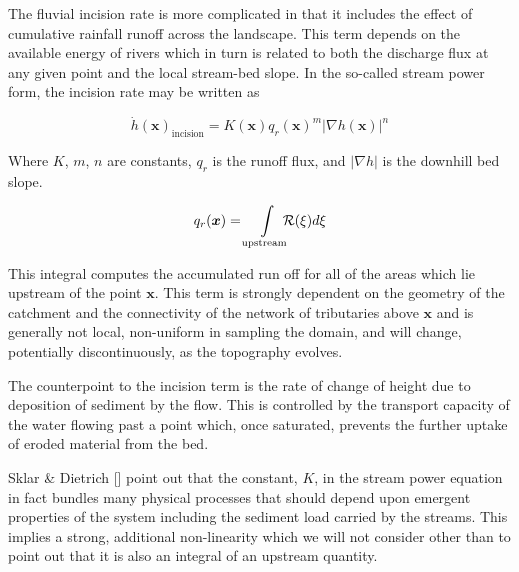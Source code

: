 \documentclass[draft,jgrga]{agu_template/AGUTeX}
\begin{document}
The fluvial incision rate is more complicated in that it includes the effect of cumulative rainfall runoff across the landscape. This term depends on the available energy of rivers which in turn is related to both the discharge flux at any given point and the local stream-bed slope. In the so-called stream power form, the incision rate may be written as  

	\begin{equation}
		\dot{h}(\bm{x})_\textrm{incision} = 
				K(\bm{x}) q_r(\bm{x})^m \left| \nabla h(\bm{x}) \right|^n
	\end{equation}

Where $K$, $m$, $n$ are constants, $q_r$ is the runoff flux, and $\left| \nabla h \right|$ is the downhill bed slope.

	\begin{equation}
		q_r(\bm{x}) = \int\displaylimits_{\textrm{upstream}} \!\!\!\! {\cal R} (\xi) d \xi
	\end{equation}

\noindent
This integral computes the accumulated run off for all of the areas which lie upstream of the point $\bm{x}$. This term is strongly dependent on the geometry of the catchment and the connectivity of the network of tributaries above $\bm{x}$ and is generally not local, non-uniform in sampling the domain, and will change, potentially discontinuously, as the topography evolves.






The counterpoint to the incision term is the rate of change of height due to deposition of sediment by the flow. This is controlled by the transport capacity of the water flowing past a point which, once saturated, prevents the further uptake of eroded material from the bed. 


Sklar \& Dietrich [] point out that the constant, $K$, in the stream power equation in fact bundles many physical processes that should depend upon emergent properties of the system including the sediment load carried by the streams. This implies a strong, additional non-linearity which we will not consider other than to point out that it is also an integral of an upstream quantity. 
\end{document}
